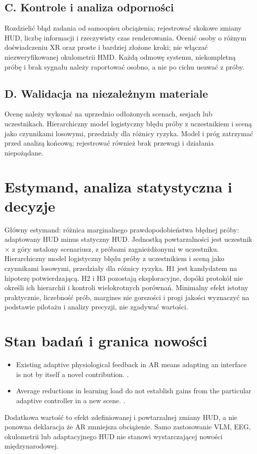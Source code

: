 \documentclass[11pt,a4paper]{article}
\begin{document}
\subsection{C. Kontrole i analiza odporności}
Rozdzielić błąd zadania od samoopisu obciążenia; rejestrować skokowe zmiany HUD, liczbę informacji i rzeczywisty czas renderowania. Ocenić osoby o różnym doświadczeniu XR oraz proste i bardziej złożone kroki; nie włączać niezweryfikowanej okulometrii HMD. Każdą odmowę systemu, niekompletną próbę i brak sygnału należy raportować osobno, a nie po cichu usuwać z próby.

\subsection{D. Walidacja na niezależnym materiale}
Ocenę należy wykonać na uprzednio odłożonych scenach, sesjach lub uczestnikach. Hierarchiczny model logistyczny błędu próby z uczestnikiem i sceną jako czynnikami losowymi, przedziały dla różnicy ryzyka. Model i próg zatrzymać przed analizą końcową; rejestrować również brak przewagi i działania niepożądane.

\section{Estymand, analiza statystyczna i decyzje}
Główny estymand: różnica marginalnego prawdopodobieństwa błędnej próby: adaptowany HUD minus statyczny HUD. Jednostką powtarzalności jest uczestnik × z góry ustalony scenariusz, z próbami zagnieżdżonymi w uczestniku. Hierarchiczny model logistyczny błędu próby z uczestnikiem i sceną jako czynnikami losowymi, przedziały dla różnicy ryzyka. H1 jest kandydatem na hipotezę potwierdzającą. H2 i H3 pozostają eksploracyjne, dopóki protokół nie określi ich hierarchii i kontroli wielokrotnych porównań. Minimalny efekt istotny praktycznie, liczebność prób, margines nie gorszości i progi jakości wyznaczyć na podstawie pilotażu i analizy precyzji, nie zgadywać wartości.

\section{Stan badań i granica nowości}
\begin{itemize}
\item Existing adaptive physiological feedback in AR means adapting an interface is not by itself a novel contribution. \cite{xrprior1}.
\item Average reductions in learning load do not establish gains from the particular adaptive controller in a new scene. \cite{xrprior2}.
\end{itemize}
Dodatkowa wartość to efekt zdefiniowanej i powtarzalnej zmiany HUD, a nie ponowna deklaracja że AR zmniejsza obciążenie. Samo zastosowanie VLM, EEG, okulometrii lub adaptacyjnego HUD nie stanowi wystarczającej nowości międzynarodowej.
\end{document}
